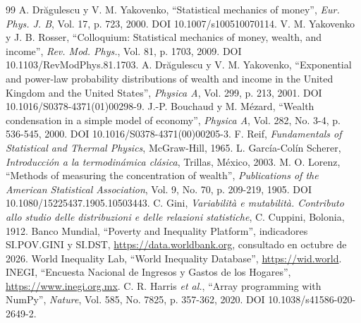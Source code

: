 \documentclass[letterpaper,12pt]{article}
\begin{document}
\begin{thebibliography}{99}
\small\setlength{\itemsep}{0pt}
 A. Drăgulescu y V. M. Yakovenko, ``Statistical mechanics of money'', \emph{Eur. Phys. J. B}, Vol. 17, p. 723, 2000. DOI 10.1007/s100510070114.
 V. M. Yakovenko y J. B. Rosser, ``Colloquium: Statistical mechanics of money, wealth, and income'', \emph{Rev. Mod. Phys.}, Vol. 81, p. 1703, 2009. DOI 10.1103/RevModPhys.81.1703.
 A. Drăgulescu y V. M. Yakovenko, ``Exponential and power-law probability distributions of wealth and income in the United Kingdom and the United States'', \emph{Physica A}, Vol. 299, p. 213, 2001. DOI 10.1016/S0378-4371(01)00298-9.
 J.-P. Bouchaud y M. Mézard, ``Wealth condensation in a simple model of economy'', \emph{Physica A}, Vol. 282, No. 3-4, p. 536-545, 2000. DOI 10.1016/S0378-4371(00)00205-3.
 F. Reif, \emph{Fundamentals of Statistical and Thermal Physics}, McGraw-Hill, 1965.
 L. García-Colín Scherer, \emph{Introducción a la termodinámica clásica}, Trillas, México, 2003.
 M. O. Lorenz, ``Methods of measuring the concentration of wealth'', \emph{Publications of the American Statistical Association}, Vol. 9, No. 70, p. 209-219, 1905. DOI 10.1080/15225437.1905.10503443.
 C. Gini, \emph{Variabilità e mutabilità. Contributo allo studio delle distribuzioni e delle relazioni statistiche}, C. Cuppini, Bolonia, 1912.
 Banco Mundial, ``Poverty and Inequality Platform'', indicadores SI.POV.GINI y SI.DST, \url{https://data.worldbank.org}, consultado en octubre de 2026.
 World Inequality Lab, ``World Inequality Database'', \url{https://wid.world}.
 INEGI, ``Encuesta Nacional de Ingresos y Gastos de los Hogares'', \url{https://www.inegi.org.mx}.
 C. R. Harris \emph{et al.}, ``Array programming with NumPy'', \emph{Nature}, Vol. 585, No. 7825, p. 357-362, 2020. DOI 10.1038/s41586-020-2649-2.
\end{thebibliography}
\end{document}
